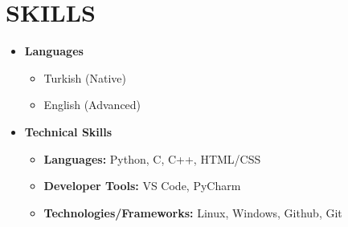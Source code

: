 \section{SKILLS}
\begin{multicols}{2}
\begin{itemize}[leftmargin=0.15in, label={}]

    \item \textbf{Languages}
    \begin{itemize}[leftmargin=0.3in]
        \item Turkish (Native)
        \item English (Advanced)
    \end{itemize}
    
    \vfill\null
    \columnbreak
    
    \item \textbf{Technical Skills}
    \begin{itemize}[leftmargin=0.3in]
        \item \textbf{Languages:} Python, C, C++, HTML/CSS
        \item \textbf{Developer Tools:} VS Code, PyCharm
        \item \textbf{Technologies/Frameworks:} Linux, Windows, Github, Git
    \end{itemize}
\end{itemize}    
\end{multicols}